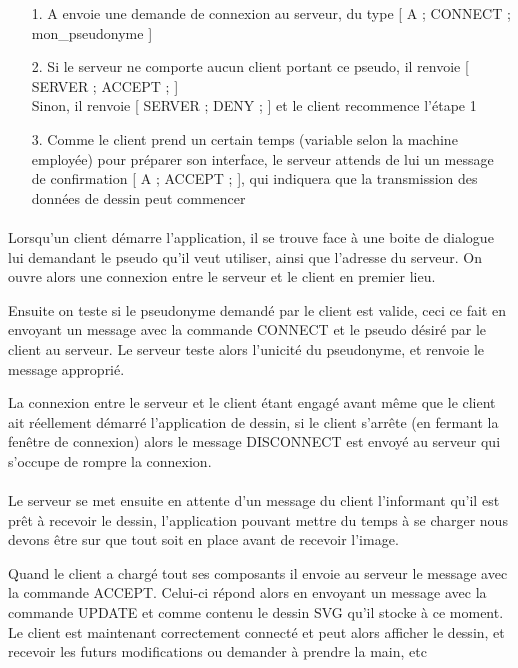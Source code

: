 \documentclass[a4paper,11pt]{article}
\begin{document}
\begin{itemize}
	\item[1.] A envoie une demande de connexion au serveur, du type [ A ; CONNECT ; mon\_pseudonyme ]
	\item[2.] Si le serveur ne comporte aucun client portant ce pseudo, il renvoie [ SERVER ; ACCEPT ; ] \\
	Sinon, il renvoie [ SERVER ; DENY ; ] et le client recommence l'étape 1
	\item[3.] Comme le client prend un certain temps (variable selon la machine employée) pour préparer son interface, le serveur attends de lui un message de confirmation [ A ; ACCEPT ; ], qui indiquera que la transmission des données de dessin peut commencer
\end{itemize}

\paragraph{}Lorsqu'un client démarre l'application, il se trouve face à une boite de dialogue lui demandant le pseudo qu'il veut utiliser, ainsi que l'adresse du serveur. On ouvre alors une connexion entre le serveur et le client en premier lieu.

Ensuite on teste si le pseudonyme demandé par le client est valide, ceci ce fait en envoyant un message avec la commande CONNECT et le pseudo désiré par le client au serveur. Le serveur teste alors l'unicité du pseudonyme, et renvoie le message approprié.

La connexion entre le serveur et le client étant engagé avant même que le client ait réellement démarré l'application de dessin, si le client s'arrête (en fermant la fenêtre de connexion) alors le message DISCONNECT est envoyé au serveur qui s'occupe de rompre la connexion.


\paragraph{} Le serveur se met ensuite en attente d'un message du client l'informant qu'il est prêt à recevoir le dessin, l'application pouvant mettre du temps à se charger nous devons être sur que tout soit en place avant de recevoir l'image.

Quand le client a chargé tout ses composants il envoie au serveur le message avec la commande ACCEPT. Celui-ci répond alors en envoyant un message avec la commande UPDATE et comme contenu le dessin SVG qu'il stocke à ce moment. Le client est maintenant correctement connecté et peut alors afficher le dessin, et recevoir les futurs modifications ou demander à prendre la main, etc
\end{document}
